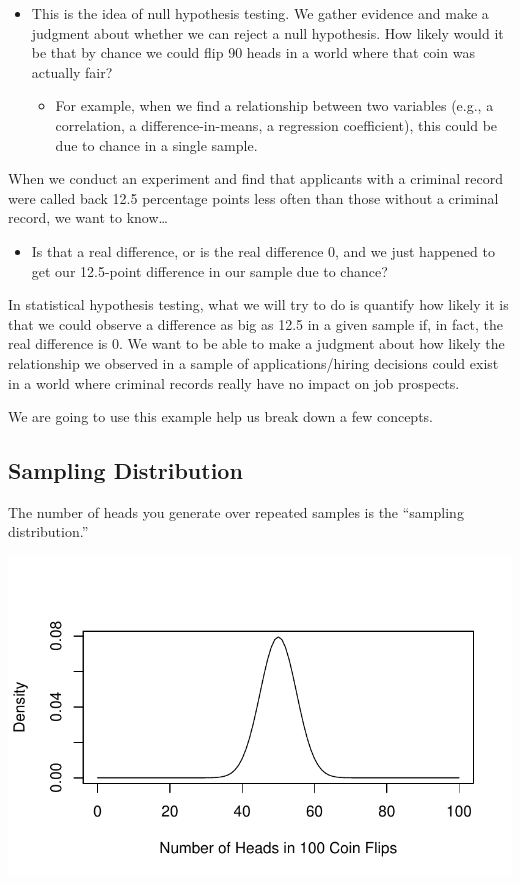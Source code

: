 \documentclass[
  letterpaper,
  DIV=11,
  numbers=noendperiod]{scrreprt}
\providecommand{\tightlist}{%
  \setlength{\itemsep}{0pt}\setlength{\parskip}{0pt}}\usepackage{longtable,booktabs,array}
\begin{document}
\begin{itemize}
\tightlist
\item
  This is the idea of null hypothesis testing. We gather evidence and
  make a judgment about whether we can reject a null hypothesis. How
  likely would it be that by chance we could flip 90 heads in a world
  where that coin was actually fair?

  \begin{itemize}
  \tightlist
  \item
    For example, when we find a relationship between two variables
    (e.g., a correlation, a difference-in-means, a regression
    coefficient), this could be due to chance in a single sample.
  \end{itemize}
\end{itemize}

When we conduct an experiment and find that applicants with a criminal
record were called back 12.5 percentage points less often than those
without a criminal record, we want to know\ldots{}

\begin{itemize}
\tightlist
\item
  Is that a real difference, or is the real difference 0, and we just
  happened to get our 12.5-point difference in our sample due to chance?
\end{itemize}

In statistical hypothesis testing, what we will try to do is quantify
how likely it is that we could observe a difference as big as 12.5 in a
given sample if, in fact, the real difference is 0. We want to be able
to make a judgment about how likely the relationship we observed in a
sample of applications/hiring decisions could exist in a world where
criminal records really have no impact on job prospects.

We are going to use this example help us break down a few concepts.

\hypertarget{sampling-distribution}{%
\subsection{Sampling Distribution}\label{sampling-distribution}}

The number of heads you generate over repeated samples is the ``sampling
distribution.''

\includegraphics{10-Uncertainty_files/figure-pdf/unnamed-chunk-1-1.pdf}
\end{document}
